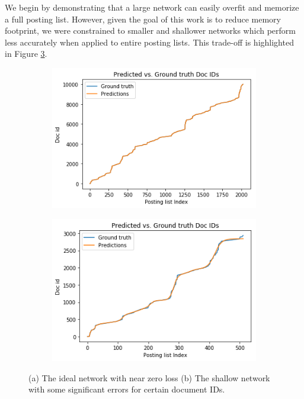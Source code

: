 \documentclass{article}
\begin{document}
We begin by demonstrating that a large network can easily overfit and memorize a full posting list.
However, given the goal of this work is to reduce memory footprint, we were constrained to smaller and shallower networks which perform less accurately when applied to entire posting lists.
This trade-off is highlighted in Figure \ref{fig:perfect_vs_shallow}.
\begin{figure}
\centering
\begin{subfigure}{0.5\textwidth}
    \includegraphics[width=\textwidth]{graphics/perfect.png}
    \label{fig:batch1}
\end{subfigure}%
\begin{subfigure}{.5\textwidth}
    \includegraphics[width=\textwidth]{graphics/shallow.png}
    \label{fig:batch2}
\end{subfigure}%
\caption{(a) The ideal network with near zero loss (b) The shallow network with some significant errors for certain document IDs.}
\label{fig:perfect_vs_shallow}
\end{figure}
\end{document}
